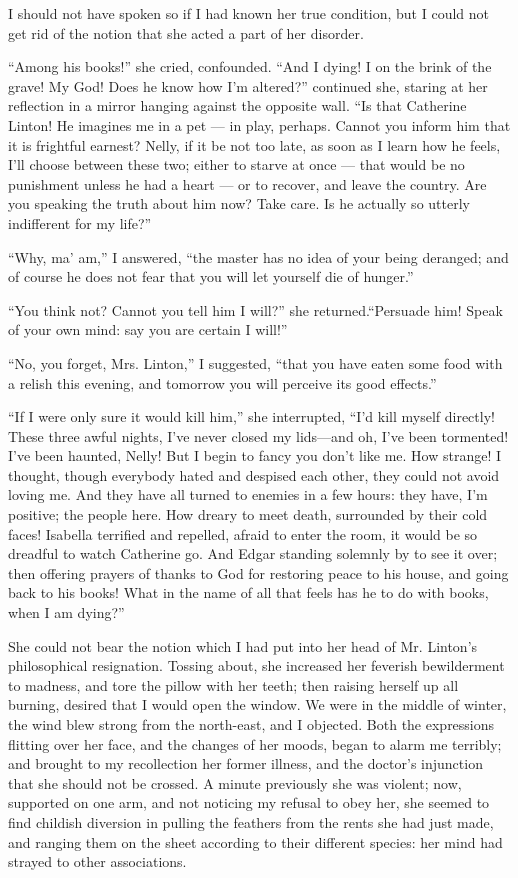 \par I should not have spoken so if I had known her true condition, but I could not get rid of the notion that she acted a part of her disorder.
\par “Among his books!” she cried, confounded. “And I dying! I on the brink of the grave! My God! Does he know how I'm altered?” continued she, staring at her reflection in a mirror hanging against the opposite wall. “Is that Catherine Linton! He imagines me in a pet — in play, perhaps. Cannot you inform him that it is frightful earnest? Nelly, if it be not too late, as soon as I learn how he feels, I'll choose between these two; either to starve at once — that would be no punishment unless he had a heart — or to recover, and leave the country. Are you speaking the truth about him now? Take care. Is he actually so utterly indifferent for my life?”
\par “Why, ma' am,” I answered, “the master has no idea of your being deranged; and of course he does not fear that you will let yourself die of hunger.”
\par “You think not? Cannot you tell him I will?” she returned.“Persuade him! Speak of your own mind: say you are certain I will!”
\par “No, you forget, Mrs. Linton,” I suggested, “that you have eaten some food with a relish this evening, and tomorrow you will perceive its good effects.”
\par “If I were only sure it would kill him,” she interrupted, “I'd kill myself directly! These three awful nights, I've never closed my lids—and oh, I've been tormented! I've been haunted, Nelly! But I begin to fancy you don't like me. How strange! I thought, though everybody hated and despised each other, they could not avoid loving me. And they have all turned to enemies in a few hours: they have, I'm positive; the people here. How dreary to meet death, surrounded by their cold faces! Isabella terrified and repelled, afraid to enter the room, it would be so dreadful to watch Catherine go. And Edgar standing solemnly by to see it over; then offering prayers of thanks to God for restoring peace to his house, and going back to his books! What in the name of all that feels has he to do with books, when I am dying?”
\par She could not bear the notion which I had put into her head of Mr. Linton's philosophical resignation. Tossing about, she increased her feverish bewilderment to madness, and tore the pillow with her teeth; then raising herself up all burning, desired that I would open the window. We were in the middle of winter, the wind blew strong from the north-east, and I objected. Both the expressions flitting over her face, and the changes of her moods, began to alarm me terribly; and brought to my recollection her former illness, and the doctor's injunction that she should not be crossed. A minute previously she was violent; now, supported on one arm, and not noticing my refusal to obey her, she seemed to find childish diversion in pulling the feathers from the rents she had just made, and ranging them on the sheet according to their different species: her mind had strayed to other associations.
